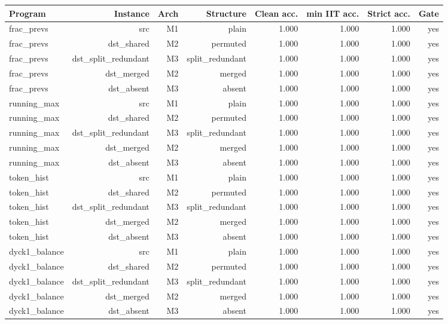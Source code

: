 \begin{table}[t]
\centering
\small
\begin{tabular}{lrrrrrrr}
\toprule
Program & Instance & Arch & Structure & Clean acc. & min IIT acc. & Strict acc. & Gate \\
\midrule
frac\_prevs & src & M1 & plain & 1.000 & 1.000 & 1.000 & yes \\
frac\_prevs & dst\_shared & M2 & permuted & 1.000 & 1.000 & 1.000 & yes \\
frac\_prevs & dst\_split\_redundant & M3 & split\_redundant & 1.000 & 1.000 & 1.000 & yes \\
frac\_prevs & dst\_merged & M2 & merged & 1.000 & 1.000 & 1.000 & yes \\
frac\_prevs & dst\_absent & M3 & absent & 1.000 & 1.000 & 1.000 & yes \\
running\_max & src & M1 & plain & 1.000 & 1.000 & 1.000 & yes \\
running\_max & dst\_shared & M2 & permuted & 1.000 & 1.000 & 1.000 & yes \\
running\_max & dst\_split\_redundant & M3 & split\_redundant & 1.000 & 1.000 & 1.000 & yes \\
running\_max & dst\_merged & M2 & merged & 1.000 & 1.000 & 1.000 & yes \\
running\_max & dst\_absent & M3 & absent & 1.000 & 1.000 & 1.000 & yes \\
token\_hist & src & M1 & plain & 1.000 & 1.000 & 1.000 & yes \\
token\_hist & dst\_shared & M2 & permuted & 1.000 & 1.000 & 1.000 & yes \\
token\_hist & dst\_split\_redundant & M3 & split\_redundant & 1.000 & 1.000 & 1.000 & yes \\
token\_hist & dst\_merged & M2 & merged & 1.000 & 1.000 & 1.000 & yes \\
token\_hist & dst\_absent & M3 & absent & 1.000 & 1.000 & 1.000 & yes \\
dyck1\_balance & src & M1 & plain & 1.000 & 1.000 & 1.000 & yes \\
dyck1\_balance & dst\_shared & M2 & permuted & 1.000 & 1.000 & 1.000 & yes \\
dyck1\_balance & dst\_split\_redundant & M3 & split\_redundant & 1.000 & 1.000 & 1.000 & yes \\
dyck1\_balance & dst\_merged & M2 & merged & 1.000 & 1.000 & 1.000 & yes \\
dyck1\_balance & dst\_absent & M3 & absent & 1.000 & 1.000 & 1.000 & yes \\

\end{tabular}
\end{table}

